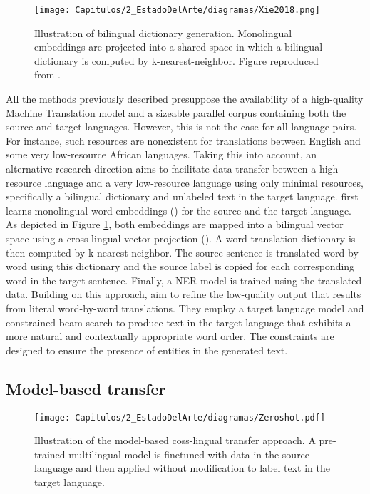 \begin{figure}[htb]
    \centering
    \texttt{[image: Capitulos/2\_EstadoDelArte/diagramas/Xie2018.png]}
    \caption{Illustration of bilingual dictionary generation. Monolingual embeddings are projected into a shared space in which a bilingual dictionary is computed by k-nearest-neighbor. Figure reproduced from \cite{xie-etal-2018-neural}.}
    \label{fig:chap3_xie2018}
\end{figure}


All the methods previously described presuppose the availability of a high-quality Machine Translation model and a sizeable parallel corpus containing both the source and target languages. However, this is not the case for all language pairs. For instance, such resources are nonexistent for translations between English and some very low-resource African languages. Taking this into account, an alternative research direction aims to facilitate data transfer between a high-resource language and a very low-resource language using only minimal resources, specifically a bilingual dictionary and unlabeled text in the target language.
\cite{xie-etal-2018-neural} first learns monolingual word embeddings (\cite{DBLP:journals/corr/abs-1301-3781,pennington-etal-2014-glove,DBLP:journals/tacl/BojanowskiGJM17}) for the source and the target language. As depicted in Figure \ref{fig:chap3_xie2018}, both embeddings are mapped into a bilingual vector space using a cross-lingual vector projection (\cite{zhang-etal-2016-ten,artetxe-etal-2016-learning,DBLP:conf/iclr/SmithTHH17}). A word translation dictionary is then computed by k-nearest-neighbor. The source sentence is translated word-by-word using this dictionary and the source label is copied for each corresponding word in the target sentence. Finally, a NER model is trained using the translated data. Building on this approach, \cite{DBLP:conf/acl/GuoR21} aim to refine the low-quality output that results from literal word-by-word translations. They employ a target language model and constrained beam search to produce text in the target language that exhibits a more natural and contextually appropriate word order. The constraints are designed to ensure the presence of entities in the generated text.


\subsection{Model-based transfer}


\begin{figure}
    \centering
    \texttt{[image: Capitulos/2\_EstadoDelArte/diagramas/Zeroshot.pdf]}
    \caption{Illustration of the model-based coss-lingual transfer approach. A pre-trained multilingual model is finetuned with data in the source language and then applied without modification to label text in the target language.}
    \label{fig:chap3_zero}
\end{figure}

